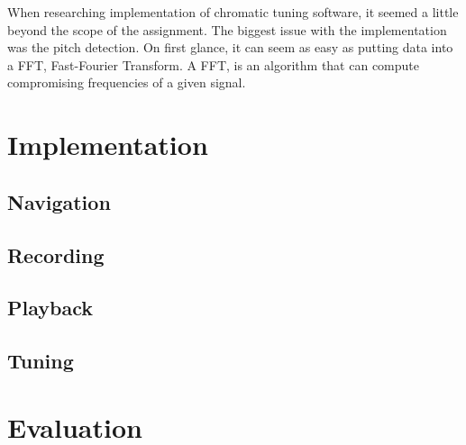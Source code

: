 \documentclass[conference]{acmsiggraph}
\begin{document}
When researching implementation of chromatic tuning software, it seemed a little beyond the scope of the assignment. The biggest issue with the implementation was the pitch detection. On first glance, it can seem as easy as putting data into a FFT, Fast-Fourier Transform. A FFT, is an algorithm that can compute compromising frequencies of a given signal. \cite{FFT}





 
\section{Implementation}

\subsection{Navigation}

\subsection{Recording}

\subsection{Playback}

\subsection{Tuning}


\section{Evaluation}


\end{document}
